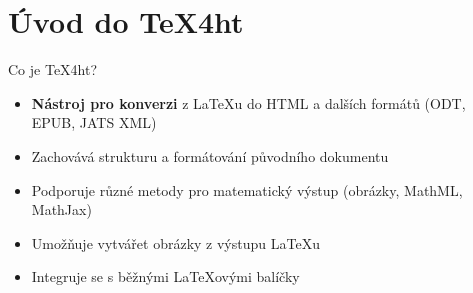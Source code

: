 
\begin{abstract}
Přednáška představí sadu šablon pro nástroj TeX4ht, který slouží k převodu
LaTeXových dokumentů do HTML. Tyto šablony výrazně usnadňují publikaci různých
typů dokumentů na webu a přinášejí moderní možnosti zpracování a automatizace.

První šablona je určena pro převod knižních dokumentů do webové podoby.
Umožňuje rozdělení textu do jednotlivých kapitol s automaticky generovanou
navigací a podporou responzivního designu, takže je výsledek dobře čitelný i na
mobilních zařízeních.

Druhá šablona slouží k tvorbě staticky generovaných blogů. Každý příspěvek je
psán jako samostatný LaTeXový dokument, který je pomocí TeX4ht převeden do
HTML. Následně jsou tyto články zpracovány statickým generátorem webů, jako je
například Jekyll, který se postará o sestavení celého blogu, vytvoření
rozcestníků, archivů a další navigace.

Třetí šablona je zaměřena na převod prezentací vytvořených v prostředí Beamer
do formy tzv. handoutů – přehledových materiálů pro posluchače. Výsledkem je
čitelný a dobře strukturovaný webový dokument vhodný pro sdílení po přednášce.

Všechny šablony jsou navrženy tak, aby fungovaly v rámci GitHub Actions. To
znamená, že dokumenty mohou být automaticky zkompilovány a publikovány online
pokaždé, když dojde ke změně v repozitáři. Tento přístup zajišťuje, že je
webová verze dokumentu vždy aktuální.
\end{abstract}


\tableofcontents

\section{Úvod do TeX4ht}

\begin{frame}{Co je TeX4ht?}
\begin{itemize}
    \item \textbf{Nástroj pro konverzi} z LaTeXu do HTML a dalších formátů (ODT, EPUB, JATS XML)
    \item Zachovává strukturu a formátování původního dokumentu
    \item Podporuje různé metody pro matematický výstup (obrázky, MathML, MathJax)
    \item Umožňuje vytvářet obrázky z výstupu \LaTeX u
    \item Integruje se s běžnými LaTeXovými balíčky
\end{itemize}
\end{frame}

